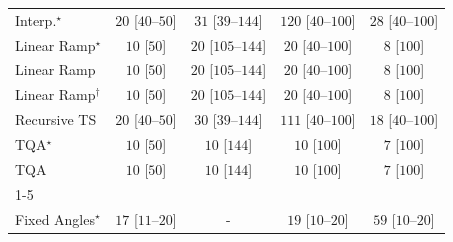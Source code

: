 \begin{tabular}{l|cccc|}
Interp.$^\star$ & {\cellcolor[HTML]{F4FBF1}} \color[HTML]{000000} $20$ [$40$--$50$] & {\cellcolor[HTML]{F2FAEF}} \color[HTML]{000000} $31$ [$39$--$144$] & {\cellcolor[HTML]{DEF2D9}} \color[HTML]{000000} $120$ [$40$--$100$] & {\cellcolor[HTML]{F2FAF0}} \color[HTML]{000000} $28$ [$40$--$100$] \\
Linear Ramp$^\star$ & {\cellcolor[HTML]{F6FCF4}} \color[HTML]{000000} $10$ [$50$] & {\cellcolor[HTML]{F4FBF1}} \color[HTML]{000000} $20$ [$105$--$144$] & {\cellcolor[HTML]{F4FBF1}} \color[HTML]{000000} $20$ [$40$--$100$] & {\cellcolor[HTML]{F6FCF4}} \color[HTML]{000000} $8$ [$100$] \\
Linear Ramp & {\cellcolor[HTML]{F6FCF4}} \color[HTML]{000000} $10$ [$50$] & {\cellcolor[HTML]{F4FBF1}} \color[HTML]{000000} $20$ [$105$--$144$] & {\cellcolor[HTML]{F4FBF1}} \color[HTML]{000000} $20$ [$40$--$100$] & {\cellcolor[HTML]{F6FCF4}} \color[HTML]{000000} $8$ [$100$] \\
Linear Ramp$^\dagger$ & {\cellcolor[HTML]{F6FCF4}} \color[HTML]{000000} $10$ [$50$] & {\cellcolor[HTML]{F4FBF1}} \color[HTML]{000000} $20$ [$105$--$144$] & {\cellcolor[HTML]{F4FBF1}} \color[HTML]{000000} $20$ [$40$--$100$] & {\cellcolor[HTML]{F6FCF4}} \color[HTML]{000000} $8$ [$100$] \\
Recursive TS & {\cellcolor[HTML]{F4FBF1}} \color[HTML]{000000} $20$ [$40$--$50$] & {\cellcolor[HTML]{F2FAEF}} \color[HTML]{000000} $30$ [$39$--$144$] & {\cellcolor[HTML]{E1F3DC}} \color[HTML]{000000} $111$ [$40$--$100$] & {\cellcolor[HTML]{F4FBF2}} \color[HTML]{000000} $18$ [$40$--$100$] \\
TQA$^\star$ & {\cellcolor[HTML]{F6FCF4}} \color[HTML]{000000} $10$ [$50$] & {\cellcolor[HTML]{F6FCF4}} \color[HTML]{000000} $10$ [$144$] & {\cellcolor[HTML]{F6FCF4}} \color[HTML]{000000} $10$ [$100$] & {\cellcolor[HTML]{F6FCF4}} \color[HTML]{000000} $7$ [$100$] \\
TQA & {\cellcolor[HTML]{F6FCF4}} \color[HTML]{000000} $10$ [$50$] & {\cellcolor[HTML]{F6FCF4}} \color[HTML]{000000} $10$ [$144$] & {\cellcolor[HTML]{F6FCF4}} \color[HTML]{000000} $10$ [$100$] & {\cellcolor[HTML]{F6FCF4}} \color[HTML]{000000} $7$ [$100$] \\
\cline{1-5}
\multicolumn{5}{c}{\rule{0pt}{8pt}SV} \\
\midrule
Fixed Angles$^\star$ & {\cellcolor[HTML]{F4FBF2}} \color[HTML]{000000} $17$ [$11$--$20$] & {\cellcolor[HTML]{000000}} \color[HTML]{F1F1F1} {\cellcolor{white}} \color{black} - & {\cellcolor[HTML]{F4FBF2}} \color[HTML]{000000} $19$ [$10$--$20$] & {\cellcolor[HTML]{ECF8E8}} \color[HTML]{000000} $59$ [$10$--$20$] \\

\end{tabular}
